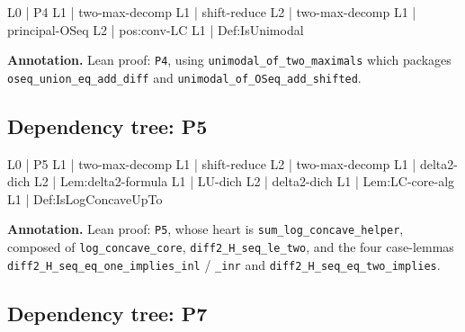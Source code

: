 \documentclass[11pt,reqno]{amsart}
\begin{document}
\noindent%
\begin{minipage}[t]{0.48\linewidth}
	\vspace{0pt}
	\begin{verbatimbox}
		L0 | P4
		L1 |   two-max-decomp
		L1 |   shift-reduce
		L2 |     two-max-decomp
		L1 |   principal-OSeq
		L2 |     pos:conv-LC
		L1 |   Def:IsUnimodal
	\end{verbatimbox}
\end{minipage}\hfill 
\begin{minipage}[t]{0.48\linewidth}
	\vspace{0pt}
	\textbf{Annotation.} Lean proof: \texttt{P4}, using \texttt{unimodal\_of\_two\_maximals} which packages \texttt{oseq\_union\_eq\_add\_diff} and \texttt{unimodal\_of\_OSeq\_add\_shifted}.
\end{minipage}

\medskip

\subsection*{Dependency tree: \textsf{P5}}

\noindent%
\begin{minipage}[t]{0.48\linewidth}
	\vspace{0pt}
	\begin{verbatimbox}
		L0 | P5
		L1 |   two-max-decomp
		L1 |   shift-reduce
		L2 |     two-max-decomp
		L1 |   delta2-dich
		L2 |     Lem:delta2-formula
		L1 |   LU-dich
		L2 |     delta2-dich
		L1 |   Lem:LC-core-alg
		L1 |   Def:IsLogConcaveUpTo
	\end{verbatimbox}
\end{minipage}\hfill 
\begin{minipage}[t]{0.48\linewidth}
	\vspace{0pt}
	\textbf{Annotation.} Lean proof: \texttt{P5}, whose heart is \texttt{sum\_log\_concave\_helper}, composed of \texttt{log\_concave\_core}, \texttt{diff2\_H\_seq\_le\_two}, and the four case-lemmas \texttt{diff2\_H\_seq\_eq\_one\_implies\_inl} / \texttt{\_inr} and \texttt{diff2\_H\_seq\_eq\_two\_implies}.
\end{minipage}

\medskip

\subsection*{Dependency tree: \textsf{P7}}
\end{document}
